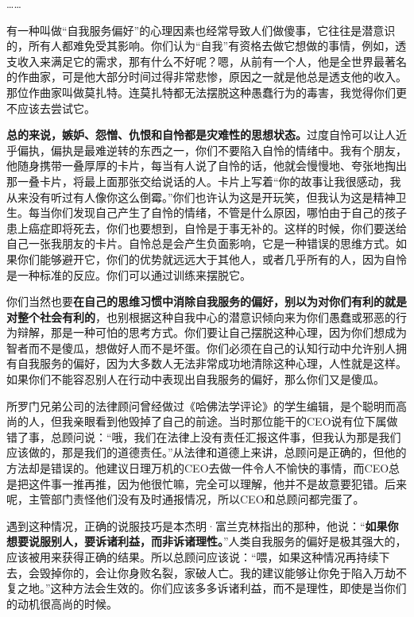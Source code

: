 {\centering ……\par}

有一种叫做“自我服务偏好”的心理因素也经常导致人们做傻事，它往往是潜意识的，所有人都难免受其影响。你们认为“自我”有资格去做它想做的事情，例如，透支收入来满足它的需求，那有什么不好呢？嗯，从前有一个人，他是全世界最著名的作曲家，可是他大部分时间过得非常悲惨，原因之一就是他总是透支他的收入。那位作曲家叫做莫扎特。连莫扎特都无法摆脱这种愚蠢行为的毒害，我觉得你们更不应该去尝试它。
\par

\textbf{总的来说，嫉妒、怨憎、仇恨和自怜都是灾难性的思想状态。}过度自怜可以让人近乎偏执，偏执是最难逆转的东西之一，你们不要陷入自怜的情绪中。我有个朋友，他随身携带一叠厚厚的卡片，每当有人说了自怜的话，他就会慢慢地、夸张地掏出那一叠卡片，将最上面那张交给说话的人。卡片上写着“你的故事让我很感动，我从来没有听过有人像你这么倒霉。”你们也许认为这是开玩笑，但我认为这是精神卫生。每当你们发现自己产生了自怜的情绪，不管是什么原因，哪怕由于自己的孩子患上癌症即将死去，你们也要想到，自怜是于事无补的。这样的时候，你们要送给自己一张我朋友的卡片。自怜总是会产生负面影响，它是一种错误的思维方式。如果你们能够避开它，你们的优势就远远大于其他人，或者几乎所有的人，因为自怜是一种标准的反应。你们可以通过训练来摆脱它。
\par

你们当然也要\textbf{在自己的思维习惯中消除自我服务的偏好，别以为对你们有利的就是对整个社会有利的}，也别根据这种自我中心的潜意识倾向来为你们愚蠢或邪恶的行为辩解，那是一种可怕的思考方式。你们要让自己摆脱这种心理，因为你们想成为智者而不是傻瓜，想做好人而不是坏蛋。你们必须在自己的认知行动中允许别人拥有自我服务的偏好，因为大多数人无法非常成功地清除这种心理，人性就是这样。如果你们不能容忍别人在行动中表现出自我服务的偏好，那么你们又是傻瓜。
\par

所罗门兄弟公司的法律顾问曾经做过《哈佛法学评论》的学生编辑，是个聪明而高尚的人，但我亲眼看到他毁掉了自己的前途。当时那位能干的CEO说有位下属做错了事，总顾问说：“哦，我们在法律上没有责任汇报这件事，但我认为那是我们应该做的，那是我们的道德责任。”从法律和道德上来讲，总顾问是正确的，但他的方法却是错误的。他建议日理万机的CEO去做一件令人不愉快的事情，而CEO总是把这件事一推再推，因为他很忙嘛，完全可以理解，他并不是故意要犯错。后来呢，主管部门责怪他们没有及时通报情况，所以CEO和总顾问都完蛋了。
\par

遇到这种情况，正确的说服技巧是本杰明·富兰克林指出的那种，他说：“\textbf{如果你想要说服别人，要诉诸利益，而非诉诸理性。}”人类自我服务的偏好是极其强大的，应该被用来获得正确的结果。所以总顾问应该说：“喂，如果这种情况再持续下去，会毁掉你的，会让你身败名裂，家破人亡。我的建议能够让你免于陷入万劫不复之地。”这种方法会生效的。你们应该多多诉诸利益，而不是理性，即使是当你们的动机很高尚的时候。
\par

